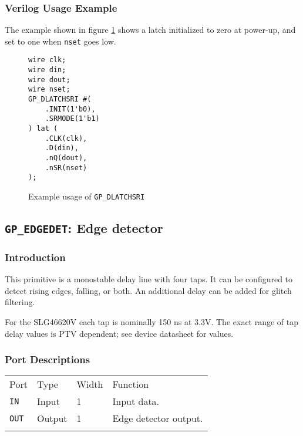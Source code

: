 \documentclass[11pt]{article}
\newcommand{\tokenstyle}[1]{\texttt{#1}}
\newcommand{\wirestyle}[1]{\texttt{#1}}
\newcommand{\whenstyle}[1]{{\fontseries{sb}\selectfont#1}}
\newcommand{\thinhline}{\Xhline{1\arrayrulewidth}}
\newcommand{\thickhline}{\Xhline{2.5\arrayrulewidth}}
\begin{document}
\subsubsection{Verilog Usage Example}

The example shown in figure \ref{gp-dlatchsri-example} shows a latch initialized to zero at power-up, and set to one
when \wirestyle{nset} goes low.

\begin{figure}[h]
\begin{lstlisting}
wire clk;
wire din;
wire dout;
wire nset;
GP_DLATCHSRI #(
	.INIT(1'b0),
	.SRMODE(1'b1)
) lat (
	.CLK(clk),
	.D(din),
	.nQ(dout),
	.nSR(nset)
);
\end{lstlisting}
\caption{Example usage of \tokenstyle{GP\_DLATCHSRI}}
\label{gp-dlatchsri-example}
\end{figure}


\pagebreak
\subsection{\tokenstyle{GP\_EDGEDET}: Edge detector}
\label{gp-edgedet}

\subsubsection{Introduction}

This primitive is a monostable delay line with four taps. It can be configured to detect rising edges, falling, or
both. An additional delay can be added for glitch filtering.

For the SLG46620V each tap is nominally 150 ns at 3.3V. The exact range of tap delay values is PTV dependent; see
device datasheet for values.

\subsubsection{Port Descriptions}

\begin{tabularx}{\textwidth}{lllX}
\thinhline
\whenstyle{Port} & \whenstyle{Type} & \whenstyle{Width} & \whenstyle{Function} \\
\thickhline
\tokenstyle{IN} & Input & 1 & Input data. \\
\thinhline
\tokenstyle{OUT} & Output & 1 & Edge detector output. \\
\thinhline
\end{tabularx}
\end{document}
